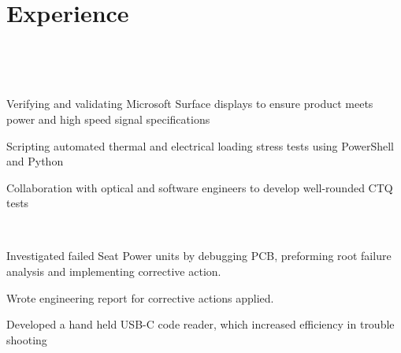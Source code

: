 \documentclass[]{hieudo-build}
\begin{document}
\begin{minipage}[t]{0.70\textwidth} 

\section{Experience}
 \\
\vspace{0.6em} %
\begin{tightemize}
\item 
\item 
\item 
\end{tightemize}
\sectionsep 

 \\
\begin{tightemize}
\item Verifying and validating Microsoft Surface displays to ensure product meets power and high speed signal specifications
\item Scripting automated thermal and electrical loading stress tests using PowerShell and Python 
\item Collaboration with optical and software engineers to develop well-rounded CTQ tests
\end{tightemize}
\sectionsep 

 \\
\begin{tightemize}
\item Investigated failed Seat Power units by debugging PCB, preforming root failure analysis and implementing corrective action.
\item Wrote engineering report for corrective actions applied.
\item Developed a hand held USB-C code reader, which increased efficiency in trouble shooting
\end{tightemize}
\sectionsep


\end{minipage}
\end{document}
